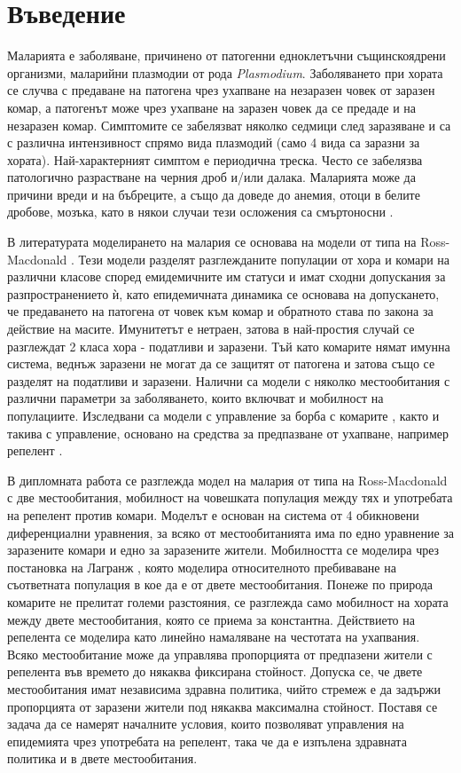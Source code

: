 \section{Въведение}
Маларията е заболяване, причинено от патогенни едноклетъчни същинскоядрени организми, маларийни плазмодии от рода \textit{Plasmodium}.
Заболяването при хората се случва с предаване на патогена чрез ухапване на незаразен човек от заразен комар, а патогенът може чрез ухапване на заразен човек да се предаде и на незаразен комар.
Симптомите се забелязват няколко седмици след заразяване и са с различна интензивност спрямо вида плазмодий (само 4 вида са заразни за хората).
Най-характерният симптом е периодична треска. Често се забелязва патологично разрастване на черния дроб и/или далака.
Маларията може да причини вреди и на бъбреците, а също да доведе до анемия, отоци в белите дробове, мозъка, като в някои случаи тези осложения са смъртоносни \cite[глава~83]{Baron1996}.

В литературата моделирането на малария се основава на модели от типа на Ross-Macdonald \cite{Smith2012}.
Тези модели разделят разглежданите популации от хора и комари на различни класове според емидемичните им статуси и имат сходни допускания за разпространението ѝ, като епидемичната динамика се основава на допускането, че предаването на патогена от човек към комар и обратното става по закона за действие на масите.
Имунитетът е нетраен, затова в най-простия случай се разглеждат 2 класа хора - податливи и заразени.
Тъй като комарите нямат имунна система, веднъж заразени не могат да се защитят от патогена и затова също се разделят на податливи и заразени.
Налични са модели \cite{Cosner2009, Ruktanonchai2016, Bichara2016, Agusto2021} с няколко местообитания с различни параметри за заболяването, които включват и мобилност на популациите.
Изследвани са модели с управление за борба с комарите \cite{DeLara2016}, както и такива с управление, основано на средства за предпазване от ухапване, например репелент \cite{Rashkov2022, Rashkov2021}.

В дипломната работа се разглежда модел на малария от типа на Ross-Macdonald с две местообитания, мобилност на човешката популация между тях и употребата на репелент против комари.
Моделът е основан на система от 4 обикновени диференциални уравнения, за всяко от местообитанията има по едно уравнение за заразените комари и едно за заразените жители.
Мобилността се моделира чрез постановка на Лагранж \cite{Cosner2009}, която моделира относителното пребиваване на съответната популация в кое да е от двете местообитания.
Понеже по природа комарите не прелитат големи разстояния, се разглежда само мобилност на хората между двете местообитания, която се приема за константна.
Действието на репелента се моделира като линейно намаляване на честотата на ухапвания.
Всяко местообитание може да управлява пропорцията от предпазени жители с репелента във времето до някаква фиксирана стойност.
Допуска се, че двете местообитания имат независима здравна политика, чийто стремеж е да задържи пропорцията от заразени жители под някаква максимална стойност.
Поставя се задача да се намерят началните условия, които позволяват управления на епидемията чрез употребата на репелент, така че да е изпълена здравната политика и в двете местообитания.
